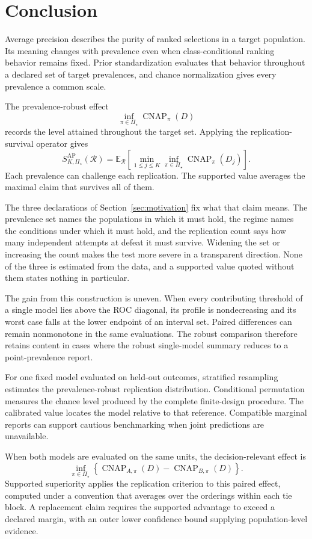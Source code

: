 \documentclass[11pt]{article}
\newcommand{\CNAP}{\operatorname{CNAP}}
\newcommand{\Regime}{\mathcal{R}}
\newcommand{\PSet}{\Pi_\star}
\newcommand{\E}{\mathbb{E}}
\theoremstyle{remark}
\begin{document}
\section{Conclusion}

Average precision describes the purity of ranked selections in a target population. Its meaning changes with prevalence even when class-conditional ranking behavior remains fixed. Prior standardization evaluates that behavior throughout a declared set of target prevalences, and chance normalization gives every prevalence a common scale.

The prevalence-robust effect
\[
\inf_{\pi\in\PSet}\CNAP_\pi(D)
\]
records the level attained throughout the target set. Applying the replication-survival operator gives
\[
S_{K,\PSet}^{\mathrm{AP}}(\Regime)
=
\E_{\Regime}
\left[
\min_{1\leq j\leq K}
\inf_{\pi\in\PSet}
\CNAP_\pi(D_j)
\right].
\]
Each prevalence can challenge each replication. The supported value averages the maximal claim that survives all of them.

The three declarations of Section~\ref{sec:motivation} fix what that claim means. The prevalence set names the populations in which it must hold, the regime names the conditions under which it must hold, and the replication count says how many independent attempts at defeat it must survive. Widening the set or increasing the count makes the test more severe in a transparent direction. None of the three is estimated from the data, and a supported value quoted without them states nothing in particular.

The gain from this construction is uneven. When every contributing threshold of a single model lies above the ROC diagonal, its profile is nondecreasing and its worst case falls at the lower endpoint of an interval set. Paired differences can remain nonmonotone in the same evaluations. The robust comparison therefore retains content in cases where the robust single-model summary reduces to a point-prevalence report.

For one fixed model evaluated on held-out outcomes, stratified resampling estimates the prevalence-robust replication distribution. Conditional permutation measures the chance level produced by the complete finite-design procedure. The calibrated value locates the model relative to that reference. Compatible marginal reports can support cautious benchmarking when joint predictions are unavailable.

When both models are evaluated on the same units, the decision-relevant effect is
\[
\inf_{\pi\in\PSet}
\left\{
\CNAP_{A,\pi}(D)-\CNAP_{B,\pi}(D)
\right\}.
\]
Supported superiority applies the replication criterion to this paired effect, computed under a convention that averages over the orderings within each tie block. A replacement claim requires the supported advantage to exceed a declared margin, with an outer lower confidence bound supplying population-level evidence.
\end{document}
